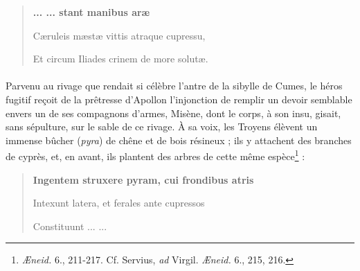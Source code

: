 \documentclass{article}
\begin{document}
\begin{quotation}\scriptsize\bfseries
... ... stant manibus aræ

Cæruleis mæstæ vittis atraque cupressu,

Et circum Iliades crinem de more solutæ.
\end{quotation}

\paragraph{}
Parvenu au rivage que rendait si célèbre l'antre de la sibylle de Cumes, le héros fugitif reçoit de la prêtresse d'Apollon l'injonction de remplir un devoir semblable envers un de ses compagnons d'armes, Misène, dont le corps, à son insu, gisait, sans sépulture, sur le sable de ce rivage. À sa voix, les Troyens élèvent un immense bûcher (\emph{pyra}) de chêne et de bois résineux ; ils y attachent des branches de cyprès, et, en avant, ils plantent des arbres de cette même espèce\footnote{\emph{Æneid.} 6., 211-217. Cf. Servius, \emph{ad} Virgil. \emph{Æneid.} 6., 215, 216.} :

\begin{quotation}\scriptsize\bfseries
Ingentem struxere pyram, cui frondibus atris

Intexunt latera, et ferales ante cupressos

Constituunt ... ...
\end{quotation}
\end{document}
